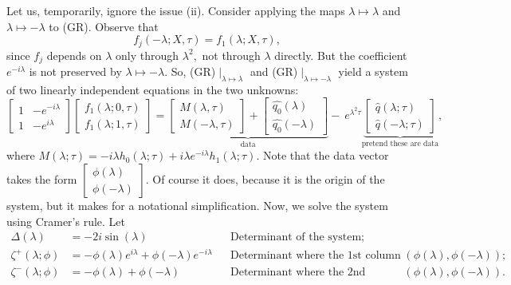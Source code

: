 Let us, temporarily, ignore the issue (ii). Consider applying the maps $\lambda \mapsto \lambda$ and $\lambda \mapsto -\lambda$ to (GR). Observe that 
\[ f_j(-\lambda;  X, \tau) = f_1(\lambda;  X, \tau),\]
since $f_j$ depends on $\lambda$ only through $\lambda^2,$ not through $\lambda$ directly. But the coefficient $e^{-i\lambda}$ is not preserved by $\lambda \mapsto -\lambda.$ So, (GR)$\mid_{\lambda \mapsto \lambda}$ and (GR)$\mid_{\lambda \mapsto -\lambda}$ yield a system of two linearly independent equations in the two unknowns:
\[
\begin{bmatrix}
1 & -e^{-i\lambda} \\
1 & -e^{i\lambda}
\end{bmatrix}
\begin{bmatrix}
f_1(\lambda;  0, \tau) \\
f_1(\lambda;  1, \tau)
\end{bmatrix}
= 
\underbrace{
\begin{bmatrix}
M(\lambda, \tau) \\
M(-\lambda, \tau)
\end{bmatrix}
+ 
\begin{bmatrix}
\widehat{q_0}(\lambda) \\
\widehat{q_0}(-\lambda)
\end{bmatrix}}_\text{data}
- ~e^{\lambda^2 \tau} \underbrace{ 
\begin{bmatrix}
\widehat{q}(\lambda; \tau) \\
\widehat{q}(-\lambda; \tau)
\end{bmatrix}}_\text{pretend these are data},
\]
where $M(\lambda; \tau) = - i \lambda h_0(\lambda; \tau) + i \lambda e^{-i \lambda} h_1(\lambda; \tau).$ Note that the data vector takes the form $\displaystyle \begin{bmatrix}
\phi(\lambda) \\
\phi(-\lambda)
\end{bmatrix}.$ Of course it does, because it is the origin of the system, but it makes for a notational simplification. Now, we solve the system using Cramer's rule. Let 
\begin{align*}
\Delta (\lambda) &= -2i \sin(\lambda) &&\text{Determinant of the system;} \\
\zeta^+ (\lambda; \phi) &= - \phi(\lambda)e^{i \lambda} +  \phi(-\lambda)e^{-i \lambda} &&\text{Determinant where the 1st column has been replaced by $(\phi(\lambda), \phi(-\lambda))$;} \\
\zeta^- (\lambda; \phi) &= - \phi(\lambda) +  \phi(-\lambda) &&\text{Determinant where the 2nd column has been replaced by $(\phi(\lambda), \phi(-\lambda)).$} \\
\end{align*}
